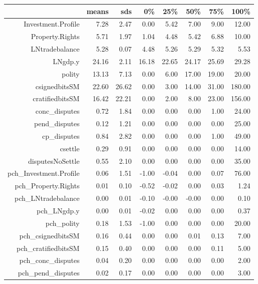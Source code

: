 \begin{table}[ht]
\centering
\begin{tabular}{rrrrrrrr}
  \hline
 & means & sds & 0\% & 25\% & 50\% & 75\% & 100\% \\ 
  \hline
Investment.Profile & 7.28 & 2.47 & 0.00 & 5.42 & 7.00 & 9.00 & 12.00 \\ 
  Property.Rights & 5.71 & 1.97 & 1.04 & 4.48 & 5.42 & 6.88 & 10.00 \\ 
  LNtradebalance & 5.28 & 0.07 & 4.48 & 5.26 & 5.29 & 5.32 & 5.53 \\ 
  LNgdp.y & 24.16 & 2.11 & 16.18 & 22.65 & 24.17 & 25.69 & 29.28 \\ 
  polity & 13.13 & 7.13 & 0.00 & 6.00 & 17.00 & 19.00 & 20.00 \\ 
  csignedbitsSM & 22.60 & 26.62 & 0.00 & 3.00 & 14.00 & 31.00 & 180.00 \\ 
  cratifiedbitsSM & 16.42 & 22.21 & 0.00 & 2.00 & 8.00 & 23.00 & 156.00 \\ 
  conc\_disputes & 0.72 & 1.84 & 0.00 & 0.00 & 0.00 & 1.00 & 24.00 \\ 
  pend\_disputes & 0.12 & 1.21 & 0.00 & 0.00 & 0.00 & 0.00 & 25.00 \\ 
  cp\_disputes & 0.84 & 2.82 & 0.00 & 0.00 & 0.00 & 1.00 & 49.00 \\ 
  csettle & 0.29 & 0.91 & 0.00 & 0.00 & 0.00 & 0.00 & 14.00 \\ 
  disputesNoSettle & 0.55 & 2.10 & 0.00 & 0.00 & 0.00 & 0.00 & 35.00 \\ 
  pch\_Investment.Profile & 0.06 & 1.51 & -1.00 & -0.04 & 0.00 & 0.07 & 76.00 \\ 
  pch\_Property.Rights & 0.01 & 0.10 & -0.52 & -0.02 & 0.00 & 0.03 & 1.24 \\ 
  pch\_LNtradebalance & 0.00 & 0.01 & -0.10 & -0.00 & -0.00 & 0.00 & 0.10 \\ 
  pch\_LNgdp.y & 0.00 & 0.01 & -0.02 & 0.00 & 0.00 & 0.00 & 0.37 \\ 
  pch\_polity & 0.18 & 1.53 & -1.00 & 0.00 & 0.00 & 0.00 & 20.00 \\ 
  pch\_csignedbitsSM & 0.16 & 0.44 & 0.00 & 0.00 & 0.01 & 0.13 & 7.00 \\ 
  pch\_cratifiedbitsSM & 0.15 & 0.40 & 0.00 & 0.00 & 0.00 & 0.11 & 5.00 \\ 
  pch\_conc\_disputes & 0.04 & 0.20 & 0.00 & 0.00 & 0.00 & 0.00 & 2.00 \\ 
  pch\_pend\_disputes & 0.02 & 0.17 & 0.00 & 0.00 & 0.00 & 0.00 & 3.00 \\ 

\end{tabular}
\end{table}
